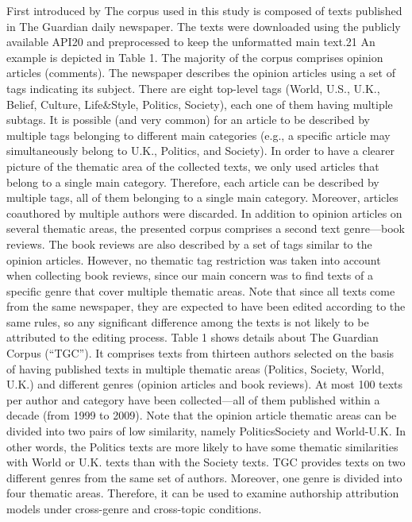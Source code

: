 First introduced by \cite{stamatatos2013robustness}
The corpus used in this study is composed of texts published
in The Guardian daily newspaper. The texts were downloaded
using the publicly available API20 and preprocessed to keep the
unformatted main text.21 An example is depicted in Table 1. 
The majority of the corpus comprises opinion articles
(comments). The newspaper describes the opinion articles using
a set of tags indicating its subject. There are eight top-level tags
(World, U.S., U.K., Belief, Culture, Life\&Style, Politics,
Society), each one of them having multiple subtags. It is
possible (and very common) for an article to be described by
multiple tags belonging to different main categories (e.g., a
specific article may simultaneously belong to U.K., Politics, and
Society). In order to have a clearer picture of the thematic area
of the collected texts, we only used articles that belong to a
single main category. Therefore, each article can be described
by multiple tags, all of them belonging to a single main
category. Moreover, articles coauthored by multiple authors
were discarded.
In addition to opinion articles on several thematic areas, the
presented corpus comprises a second text genre—book reviews.
The book reviews are also described by a set of tags similar to
the opinion articles. However, no thematic tag restriction was
taken into account when collecting book reviews, since our main
concern was to find texts of a specific genre that cover multiple thematic areas. Note that since all texts come from the same
newspaper, they are expected to have been edited according to
the same rules, so any significant difference among the texts is
not likely to be attributed to the editing process.
Table 1 shows details about The Guardian Corpus (“TGC”).
It comprises texts from thirteen authors selected on the basis of
having published texts in multiple thematic areas (Politics,
Society, World, U.K.) and different genres (opinion articles and
book reviews). At most 100 texts per author and category have
been collected—all of them published within a decade (from
1999 to 2009). Note that the opinion article thematic areas can
be divided into two pairs of low similarity, namely PoliticsSociety and World-U.K. In other words, the Politics texts are
more likely to have some thematic similarities with World or
U.K. texts than with the Society texts.
TGC provides texts on two different genres from the same
set of authors. Moreover, one genre is divided into four
thematic areas. Therefore, it can be used to examine authorship
attribution models under cross-genre and cross-topic conditions.
